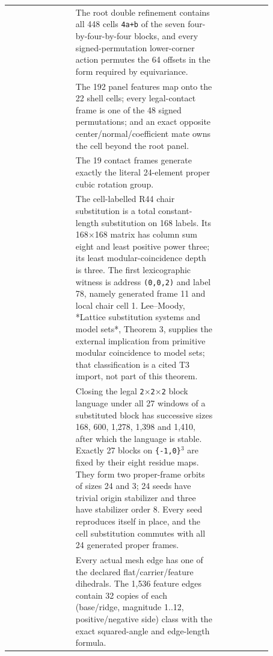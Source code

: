 {\begin{longtable}{L{0.22\linewidth} L{0.48\linewidth} L{0.17\linewidth}}
 & The root double refinement contains all 448 cells \texttt{4a+b} of the seven four-by-four-by-four blocks, and every signed-permutation lower-corner action permutes the 64 offsets in the form required by equivariance. &  \\
 & The 192 panel features map onto the 22 shell cells; every legal-contact frame is one of the 48 signed permutations; and an exact opposite center/\allowbreak{}normal/\allowbreak{}coefficient mate owns the cell beyond the root panel. &  \\
 & The 19 contact frames generate exactly the literal 24-element proper cubic rotation group. &  \\
 & The cell-labelled R44 chair substitution is a total constant-length substitution on 168 labels. Its 168$\times$168 matrix has column sum eight and least positive power three; its least modular-coincidence depth is three. The first lexicographic witness is address \texttt{(0,0,2)} and label 78, namely generated frame 11 and local chair cell 1. Lee--Moody, *Lattice substitution systems and model sets*, Theorem 3, supplies the external implication from primitive modular coincidence to model sets; that classification is a cited T3 import, not part of this theorem. &  \\
 & Closing the legal \texttt{2$\times$2$\times$2} block language under all 27 windows of a substituted block has successive sizes 168, 600, 1,278, 1,398 and 1,410, after which the language is stable. Exactly 27 blocks on \texttt{\{-1,0\}$^3$} are fixed by their eight residue maps. They form two proper-frame orbits of sizes 24 and 3; 24 seeds have trivial origin stabilizer and three have stabilizer order 8. Every seed reproduces itself in place, and the cell substitution commutes with all 24 generated proper frames. &  \\
 & Every actual mesh edge has one of the declared flat/\allowbreak{}carrier/\allowbreak{}feature dihedrals. The 1,536 feature edges contain 32 copies of each (base/\allowbreak{}ridge, magnitude 1..12, positive/\allowbreak{}negative side) class with the exact squared-angle and edge-length formula. &  \\
\end{longtable}}

